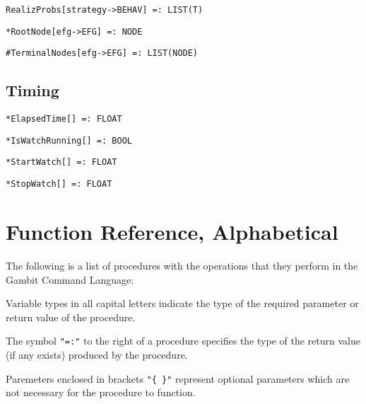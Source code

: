 \protect \large \begin{verbatim}
RealizProbs[strategy->BEHAV] =: LIST(T)
\end{verbatim}\normalsize

\protect \large \begin{verbatim}
*RootNode[efg->EFG] =: NODE
\end{verbatim}\normalsize

\protect \large \begin{verbatim} 
#TerminalNodes[efg->EFG] =: LIST(NODE)
\end{verbatim}\normalsize


\medskip
\subsection{Timing}


\protect \large \begin{verbatim}
*ElapsedTime[] =: FLOAT
\end{verbatim}\normalsize


\protect \large \begin{verbatim}
*IsWatchRunning[] =: BOOL
\end{verbatim}\normalsize


\protect \large \begin{verbatim}
*StartWatch[] =: FLOAT
\end{verbatim}\normalsize


\protect \large \begin{verbatim}
*StopWatch[] =: FLOAT
\end{verbatim}\normalsize


\section{Function Reference, Alphabetical}

The following is a list of procedures with the operations that they
perform in the Gambit Command Language:

Variable types in all capital letters indicate the type of the
required parameter or return value of the procedure.

The symbol {\tt "=:"} to the right of a procedure specifies the type
of the return value (if any exists) produced by the procedure.

Paremeters enclosed in brackets {\tt "\{ \}"} represent optional
parameters which are not necessary for the procedure to function.

